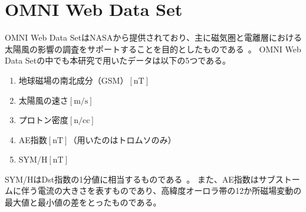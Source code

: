 \chapter{OMNI Web Data Set}
\label{app:omni}
OMNI Web Data SetはNASAから提供されており、主に磁気圏と電離層における太陽風の影響の調査をサポートすることを目的としたものである~\cite{king2023omni}。
OMNI Web Data Setの中でも本研究で用いたデータは以下の5つである。
\begin{enumerate}
    \item 地球磁場の南北成分（GSM）$[\mathrm{nT}]$
    \item 太陽風の速さ$[\mathrm{m/s}]$
    \item プロトン密度$[\mathrm{n/cc}]$
    \item AE指数$[\mathrm{nT}]$（用いたのはトロムソのみ）
    \item SYM/H$[\mathrm{nT}]$
\end{enumerate} \par
SYM/HはDst指数の1分値に相当するものである~\cite{wdc2009asysym}。
また、AE指数はサブストームに伴う電流の大きさを表すものであり、高緯度オーロラ帯の12か所磁場変動の最大値と最小値の差をとったものである。
